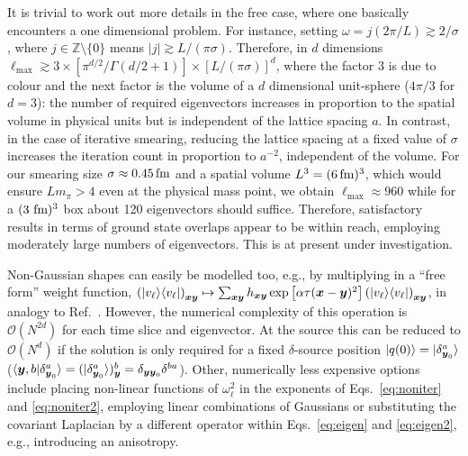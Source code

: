 It is trivial to work out more details in the free case, where
one basically encounters a one dimensional problem.
For instance, setting $\omega= j (2\pi/L)\gtrsim 2/\sigma$,
where $j\in\mathbb{Z}\setminus\{0\}$
means
$|j|\gtrsim L/(\pi\sigma)$. Therefore, in $d$ dimensions
$\ell_{\max}\gtrsim 3\times[\pi^{d/2}/\Gamma(d/2+1)]\times[L/(\pi\sigma)]^d$, where the
factor $3$ is due to colour and the next factor is the volume
of a $d$ dimensional unit-sphere ($4\pi/3$ for $d=3$): the number of
required eigenvectors increases in proportion to the
spatial volume in physical units
but is independent of the lattice spacing $a$.
In contrast, in the case of iterative smearing, reducing the lattice spacing
at a fixed value of $\sigma$ increases the iteration count
in proportion to $a^{-2}$, independent of the volume.
For our smearing size $\sigma\approx0.45\,\textmd{fm}$ and a spatial volume
$L^3=(6\,\textmd{fm})^3$, which
would ensure $Lm_{\pi}>4$ even at the physical mass point, we obtain
$\ell_{\max}\approx 960$ while
for a $(3\,\,\textmd{fm})^3$ box
about 120 eigenvectors should suffice.
Therefore, satisfactory results in terms of
ground state overlaps appear to be within reach, employing moderately
large numbers of eigenvectors. This is at present under investigation.

Non-Gaussian shapes can easily
be modelled too, e.g., by multiplying in a ``free form'' weight
function, $\left(|v_{\ell}\rangle\langle v_{\ell}|\right)_{\boldsymbol{x}\boldsymbol{y}}
\mapsto \sum_{\boldsymbol{xy}}h_{\boldsymbol{x}\boldsymbol{y}}\exp\left[\alpha\tau(\boldsymbol{x}-\boldsymbol{y})^2\right]\left(|v_{\ell}\rangle\langle v_{\ell}|\right)_{\boldsymbol{x}\boldsymbol{y}}$,
in analogy to Ref.~\cite{vonHippel:2013yfa}.
However, the numerical complexity of this operation is
$\mathcal{O}(N^{2d})$ for each time slice and eigenvector. At the
source this can be reduced to $\mathcal{O}(N^{d})$
if the solution is only required
for a fixed $\delta$-source position
$|q(0)\rangle=|\delta_{\boldsymbol{y}_0}^a\rangle$
($\langle\boldsymbol{y},b|\delta_{\boldsymbol{y}_0}^a\rangle=(|\delta_{\boldsymbol{y}_0}^a\rangle)_{\boldsymbol{y}}^b=\delta_{\boldsymbol{y}\boldsymbol{y}_0}\delta^{ba}$).
Other, numerically less expensive options include
placing non-linear functions of $\omega^2_{\ell}$ in the exponents
of Eqs.~\eqref{eq:noniter} and \eqref{eq:noniter2}, employing
linear combinations of Gaussians or substituting the covariant
Laplacian by a different
operator within Eqs.~\eqref{eq:eigen} and \eqref{eq:eigen2}, e.g.,
introducing an anisotropy.

